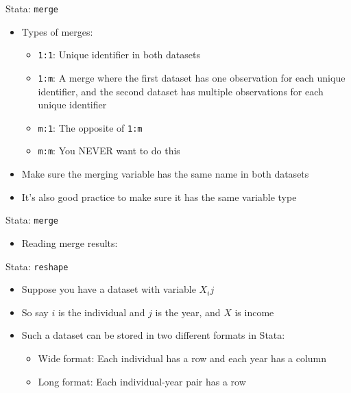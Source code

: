 \documentclass[11pt,notes=hide,aspectratio=169,mathserif]{beamer}
\begin{document}
\begin{frame}{Stata: \texttt{merge}}
\begin{itemize}
\item Types of merges:
\begin{itemize}
    \item \texttt{1:1}: Unique identifier in both datasets
    \item \texttt{1:m}: A merge where the first dataset has one observation for each unique identifier, and the second dataset has multiple observations for each unique identifier
    \item \texttt{m:1}: The opposite of \texttt{1:m}
    \item \texttt{m:m}: You NEVER want to do this
\end{itemize}
\item Make sure the merging variable has the same name in both datasets
\item It's also good practice to make sure it has the same variable type 
\end{itemize}
\end{frame}

\begin{frame}{Stata: \texttt{merge}}
\begin{itemize}
\item Reading merge results:
\end{itemize}
\end{frame}
    

\begin{frame}{Stata: \texttt{reshape}}
\begin{itemize}
\item Suppose you have a dataset with variable $X_ij$
\item So say $i$ is the individual and $j$ is the year, and $X$ is income 
\item Such a dataset can be stored in two different formats in Stata:
\begin{itemize}
    \item Wide format: Each individual has a row and each year has a column
    \item Long format: Each individual-year pair has a row
\end{itemize}
\end{itemize}
\end{frame}
\end{document}

